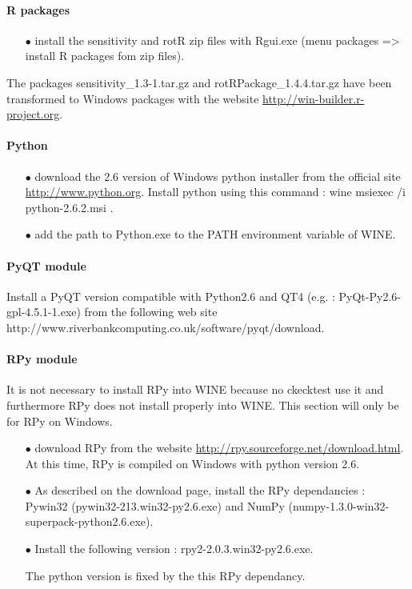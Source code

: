 \documentclass[11pt]{article}
\begin{document}
\paragraph{R packages}

\begin{itemize}
\item[$\bullet$]  install the sensitivity and rotR zip files with Rgui.exe  (menu packages => install R packages fom zip files).
\end{itemize}

The packages sensitivity\_1.3-1.tar.gz and rotRPackage\_1.4.4.tar.gz have been transformed to Windows packages with the website \url{http://win-builder.r-project.org}.


\paragraph{Python}

\begin{itemize}
\item[$\bullet$]  download the 2.6 version of Windows python installer from the official site \url{http://www.python.org}. Install python using this command : wine msiexec /i python-2.6.2.msi .
\item[$\bullet$]  add the path to Python.exe to the PATH environment variable of WINE.
\end{itemize}

\paragraph{PyQT module}

Install a PyQT version compatible with Python2.6 and QT4 (e.g. : PyQt-Py2.6-gpl-4.5.1-1.exe) from the following web site http://www.riverbankcomputing.co.uk/software/pyqt/download.

\paragraph{RPy module}

It is not necessary to install RPy into WINE because no ckecktest use it and furthermore RPy does not install properly into WINE. This section will only be for RPy on Windows.

\begin{itemize}
\item[$\bullet$]  download RPy from the website \url{http://rpy.sourceforge.net/download.html}. At this time, RPy is compiled on Windows with python version 2.6.
\item[$\bullet$]  As described on the download page, install the RPy dependancies : Pywin32 (pywin32-213.win32-py2.6.exe) and NumPy (numpy-1.3.0-win32-superpack-python2.6.exe).
\item[$\bullet$]  Install the following version : rpy2-2.0.3.win32-py2.6.exe.

  The python version is fixed by the this RPy dependancy.
\end{itemize}
\end{document}
